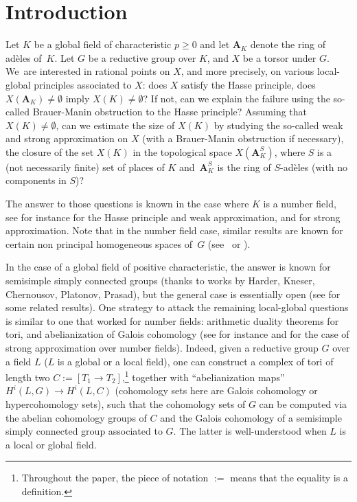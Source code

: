 \documentclass[JEP,XML,SOM,Unicode, NoEqCountersInSection]{cedram}
\theoremstyle{plain}
\theoremstyle{definition}
\renewcommand\AA{\mathbf{A}}
\begin{document}
\maketitle
\tableofcontents
\mainmatter

\section{Introduction}\label{intro}

Let $K$ be a global field of characteristic $p \geq 0$ and let $\AA_K$ denote the ring of adèles of~$K$. Let $G$ be a reductive group over $K$, and $X$ be a torsor under $G$. We~are interested in rational points on $X$, and more precisely, on various local-global \hbox{principles} associated to $X$: does $X$ satisfy the Hasse principle, \ie does $X(\AA_K) \neq \emptyset$ imply $X(K) \neq \emptyset$? If not, can we explain the failure using the so-called Brauer-Manin obstruc\-tion to the Hasse principle? Assuming that $X(K) \neq \emptyset$, can we estimate the size of $X(K)$ by studying the so-called weak and strong approximation on $X$ (with a Brauer-Manin obstruction if necessary), \ie the closure of the set $X(K)$ in the topological space $X(\AA_K^S)$, where $S$ is a (not necessarily finite) set of places of $K$ and~$\AA_K^S$ is the ring of $S$-adèles (with no components in $S$)?

The answer to those questions is known in the case where $K$ is a number field, see for instance \cite[Cor.\,8.7 \& 8.13]{San} for the Hasse principle and weak approximation, and \cite[Th.\,3.14]{demlms} for strong approximation. Note that in the number field case, similar results are known for certain
non principal
homogeneous spaces of~$G$ (see~\cite{Bor} or \cite{BD}).

In the case of a global field of positive characteristic, the answer is known for semisimple simply connected groups (thanks to works by Harder, Kneser, Chernousov, Platonov, Prasad), but the general case is essentially open (see \cite[Th.\,1.9]{Ros} for some related results). One strategy to attack the remaining local-global questions is similar to one that worked for number fields: arithmetic duality theorems for tori, and abelianization of Galois cohomology (see for instance \cite{demphd} and \cite{demlms} for the case of strong approximation over number fields). Indeed, given a reductive group $G$ over a field $L$ (\eg $L$ is a global or a local field), one can construct a complex of tori of length two $C:= [T_1 \to T_2]$,\footnote{Throughout the paper, the piece of notation $:=$
means that the equality is a definition.}
together with ``abelianization maps'' $H^i(L,G) \to H^i(L,C)$ (cohomology sets here are Galois cohomology or hypercohomology sets), such that the cohomology sets of $G$ can be computed via the abelian cohomology groups of $C$ and the Galois cohomology of a semisimple simply connected group associated to $G$. The latter is well-understood when $L$ is a local or global field.
\end{document}

